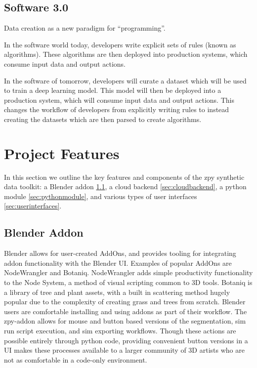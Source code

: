 \documentclass{article}
\begin{document}
\subsection{Software 3.0}
\label{sec:software3.0}

Data creation as a new paradigm for “programming”.

In the software world today, developers write explicit sets of rules (known as algorithms). These algorithms are then deployed into production systems, which consume input data and output actions.

In the software of tomorrow, developers will curate a dataset which will be used to train a deep learning model. This model will then be deployed into a production system, which will consume input data and output actions. This changes the workflow of developers from explicitly writing rules to instead creating the datasets which are then parsed to create algorithms.

\section{Project Features}
\label{sec:projectfeatures}

In this section we outline the key features and components of the zpy synthetic data toolkit: a Blender addon \ref{sec:blenderaddon}, a cloud backend \ref{sec:cloudbackend}, a python module \ref{sec:pythonmodule}, and various types of user interfaces \ref{sec:userinterfaces}.

\subsection{Blender Addon}
\label{sec:blenderaddon}

Blender allows for user-created AddOns, and provides tooling for integrating addon functionality with the Blender UI. Examples of popular AddOns are NodeWrangler and Botaniq. NodeWrangler adds simple productivity functionality to the Node System, a method of visual scripting common to 3D tools. Botaniq is a library of tree and plant assets, with a built in scattering method hugely popular due to the complexity of creating grass and trees from scratch. Blender users are comfortable installing and using addons as part of their workflow. The zpy-addon allows for mouse and button based versions of the segmentation, sim run script execution, and sim exporting workflows. Though these actions are possible entirely through python code, providing convenient button versions in a UI makes these processes available to a larger community of 3D artists who are not as comfortable in a code-only environment.
\end{document}
